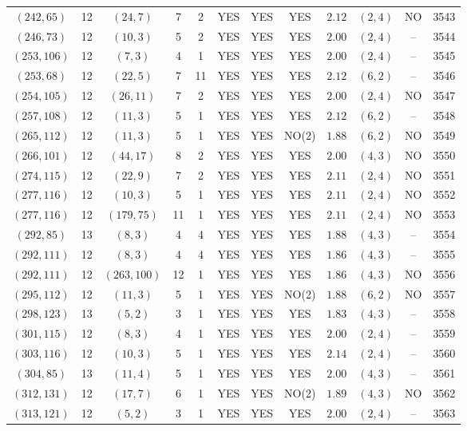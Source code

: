 \begin{longtable}{|c|c|c|c|c|c|c|c|c|c|c|c|}
$(242,65)$ & 12 & $(24,7)$ & 7 & 2 & YES & YES & YES & $2.12$ & $(2,4)$ & NO & 3543\\
$(246,73)$ & 12 & $(10,3)$ & 5 & 2 & YES & YES & YES & $2.00$ & $(2,4)$ & -- & 3544\\
$(253,106)$ & 12 & $(7,3)$ & 4 & 1 & YES & YES & YES & $2.00$ & $(2,4)$ & -- & 3545\\
$(253,68)$ & 12 & $(22,5)$ & 7 & 11 & YES & YES & YES & $2.12$ & $(6,2)$ & -- & 3546\\
$(254,105)$ & 12 & $(26,11)$ & 7 & 2 & YES & YES & YES & $2.00$ & $(2,4)$ & NO & 3547\\
$(257,108)$ & 12 & $(11,3)$ & 5 & 1 & YES & YES & YES & $2.12$ & $(6,2)$ & -- & 3548\\
$(265,112)$ & 12 & $(11,3)$ & 5 & 1 & YES & YES & NO(2) & $1.88$ & $(6,2)$ & NO & 3549\\
$(266,101)$ & 12 & $(44,17)$ & 8 & 2 & YES & YES & YES & $2.00$ & $(4,3)$ & NO & 3550\\
$(274,115)$ & 12 & $(22,9)$ & 7 & 2 & YES & YES & YES & $2.11$ & $(2,4)$ & NO & 3551\\
$(277,116)$ & 12 & $(10,3)$ & 5 & 1 & YES & YES & YES & $2.11$ & $(2,4)$ & NO & 3552\\
$(277,116)$ & 12 & $(179,75)$ & 11 & 1 & YES & YES & YES & $2.11$ & $(2,4)$ & NO & 3553\\
$(292,85)$ & 13 & $(8,3)$ & 4 & 4 & YES & YES & YES & $1.88$ & $(4,3)$ & -- & 3554\\
$(292,111)$ & 12 & $(8,3)$ & 4 & 4 & YES & YES & YES & $1.86$ & $(4,3)$ & -- & 3555\\
$(292,111)$ & 12 & $(263,100)$ & 12 & 1 & YES & YES & YES & $1.86$ & $(4,3)$ & NO & 3556\\
$(295,112)$ & 12 & $(11,3)$ & 5 & 1 & YES & YES & NO(2) & $1.88$ & $(6,2)$ & NO & 3557\\
$(298,123)$ & 13 & $(5,2)$ & 3 & 1 & YES & YES & YES & $1.83$ & $(4,3)$ & -- & 3558\\
$(301,115)$ & 12 & $(8,3)$ & 4 & 1 & YES & YES & YES & $2.00$ & $(2,4)$ & -- & 3559\\
$(303,116)$ & 12 & $(10,3)$ & 5 & 1 & YES & YES & YES & $2.14$ & $(2,4)$ & -- & 3560\\
$(304,85)$ & 13 & $(11,4)$ & 5 & 1 & YES & YES & YES & $2.00$ & $(4,3)$ & -- & 3561\\
$(312,131)$ & 12 & $(17,7)$ & 6 & 1 & YES & YES & NO(2) & $1.89$ & $(4,3)$ & NO & 3562\\
$(313,121)$ & 12 & $(5,2)$ & 3 & 1 & YES & YES & YES & $2.00$ & $(2,4)$ & -- & 3563\\

\end{longtable}
